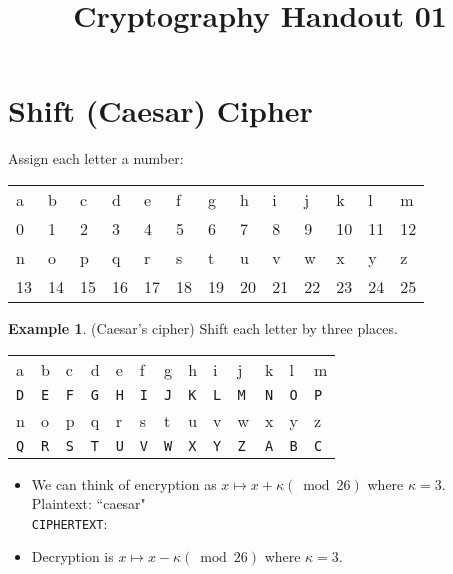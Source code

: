 \documentclass[12pt]{amsart}
\makeatletter
\def\subtitle#1{\gdef\@subtitle{#1}}
\def\@subtitle{}
\theoremstyle{plain}
\theoremstyle{definition}
\newtheorem*{ex}{Example}
\theoremstyle{remark}
\newcommand{\bit}{\begin{itemize}}
\newcommand{\eit}{\end{itemize}}
\newcommand{\bex}{\begin{ex}}
\newcommand{\eex}{\end{ex}}
\newcommand{\bcen}{\begin{center}}
\newcommand{\ecen}{\end{center}}
\makeatother
\begin{document}
\onehalfspacing

\title[]{Cryptography Handout 01}
\subtitle{Shift and Affine Ciphers}
\maketitle

\section{Shift (Caesar) Cipher}

Assign each letter a number:

\bcen
\begin{tabular}{|p{.25in}|p{.25in}|p{.25in}|p{.25in}|p{.25in}|p{.25in}|p{.25in}|p{.25in}|p{.25in}|p{.25in}|p{.25in}|p{.25in}|p{.25in}|}\hline
a & b & c & d & e & f & g & h & i & j & k & l & m\\
0 & 1 & 2 & 3 & 4 & 5 & 6 & 7 & 8 & 9 & 10 & 11 & 12 \\ \hline
n & o & p & q & r & s & t & u & v & w & x & y & z\\
13 &14 & 15 & 16 & 17 & 18 & 19 & 20 & 21 & 22 & 23 & 24 & 25\\ \hline
\end{tabular}
\ecen

\bex
(Caesar's cipher) Shift each letter by three places.

\bcen
\begin{tabular}{|p{.25in}|p{.25in}|p{.25in}|p{.25in}|p{.25in}|p{.25in}|p{.25in}|p{.25in}|p{.25in}|p{.25in}|p{.25in}|p{.25in}|p{.25in}|}\hline
a & b & c & d & e & f & g & h & i & j & k & l & m\\
\texttt{D} & \texttt{E} & \texttt{F} & \texttt{G} & \texttt{H} & \texttt{I} & \texttt{J} & \texttt{K} & \texttt{L} & \texttt{M} & \texttt{N} & \texttt{O} & \texttt{P} \\ \hline
n & o & p & q & r & s & t & u & v & w & x & y & z\\
\texttt{Q} & \texttt{R} & \texttt{S} & \texttt{T} & \texttt{U} & \texttt{V} & \texttt{W} & \texttt{X} & \texttt{Y} & \texttt{Z} & \texttt{A} & \texttt{B} & \texttt{C}\\ \hline
\end{tabular}
\ecen


\bit
	\item We can think of encryption as $x \mapsto x + \kappa (\bmod 26)$ where $\kappa = 3$.\\
	Plaintext: ``caesar"\\
	\texttt{CIPHERTEXT}: \\
	\item Decryption is $x \mapsto x - \kappa (\bmod 26)$ where $\kappa = 3$.
\eit
\eex
\end{document}
